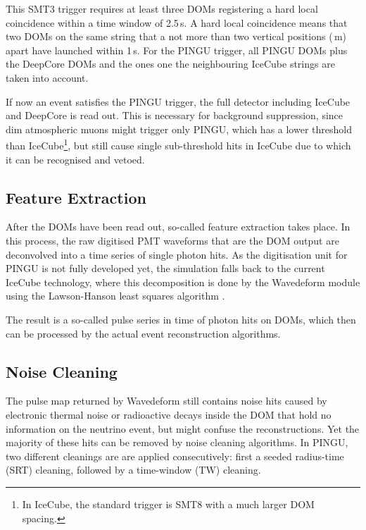 This SMT3 trigger requires at least three DOMs registering a hard local
coincidence within a time window of 2.5\,\textmu s. A hard local coincidence
means that two DOMs on the same string that a not more than two vertical
positions (\,m) apart have launched within 1\,\textmu s. For the PINGU
trigger, all PINGU DOMs plus the DeepCore DOMs and the ones one the neighbouring
IceCube strings are taken into account.

If now an event satisfies the PINGU trigger, the full detector including
IceCube and DeepCore is read out. This is necessary for background suppression,
since dim atmospheric muons might trigger only PINGU, which has a lower
threshold than IceCube\footnote{In IceCube, the standard trigger is SMT8 with a
much larger DOM spacing.}, but still cause single sub-threshold hits in IceCube
due to which it can be recognised and vetoed.


\subsection{Feature Extraction}
\label{sec:reco_feature}

After the DOMs have been read out, so-called feature extraction takes place. In
this process, the raw digitised PMT waveforms that are the DOM output are
deconvolved into a time series of single photon hits. As the digitisation unit
for PINGU is not fully developed yet, the simulation falls back to the current
IceCube technology, where this decomposition is done by the Wavedeform module
\cite{Wavedeform} using the Lawson-Hanson least squares algorithm
\cite{LawsonHanson}.

The result is a so-called pulse series in time of photon hits on DOMs, which
then can be processed by the actual event reconstruction algorithms.

\subsection{Noise Cleaning}
\label{sec:reco_noise}

The pulse map returned by Wavedeform still contains noise hits caused by
electronic thermal noise or radioactive decays inside the DOM that hold no
information on the neutrino event, but might confuse the reconstructions. Yet
the majority of these hits can be removed by noise cleaning algorithms. In
PINGU, two different cleanings are are applied consecutively: first a seeded
radius-time (SRT) cleaning, followed by a time-window (TW) cleaning.

